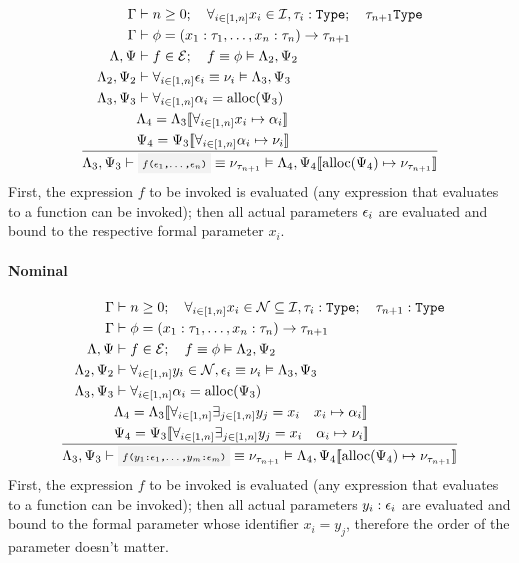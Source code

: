 \[
	\oprule[aligned]{
		\EnvSym               &\then n \geq 0 \semiq \forall_{i\in[1,n]}{x_i\in\Id,\tau_i:\Type} \semiq \tau_{n+1}\Type \\*
		\EnvSym               &\then \phi = (x_1:\tau_1,\dotsc,x_n:\tau_n)\to\tau_{n+1} \\*
		\EnvLoc,\EnvStore     &\then f\in\Expr \semiq f \eval \phi \Then \EnvLoc_2,\EnvStore_2 \\*
		\EnvLoc_2,\EnvStore_2 &\then \forall_{i\in[1,n]}{\expr_i\eval\val_i} \Then \EnvLoc_3,\EnvStore_3 \\*
		\EnvLoc_3,\EnvStore_3 &\then \forall_{i\in[1,n]}{\addr_i=\alloc(\EnvStore_3)} \\*
		                      &\EnvLoc_4 = \EnvLoc_3\env{\forall_{i\in[1,n]}{x_i\mapsto\addr_i}} \\*
		                      &\EnvStore_4 = \EnvStore_3\env{\forall_{i\in[1,n]}{\addr_i\mapsto\val_i}} \\*
	}{
		\EnvLoc_3,\EnvStore_3 \then \code{$f$($\expr_1$,$\dotsc$,$\expr_n$)} \eval \val_{\tau_{n+1}} \Then \EnvLoc_4,\EnvStore_4\env{\alloc(\EnvStore_4)\mapsto\val_{\tau_{n+1}}}
	}
\]
First, the expression $f$ to be invoked is evaluated (any expression that
evaluates to a function can be invoked); then all actual parameters $\epsilon_i$
are evaluated and bound to the respective formal parameter $x_i$.

\paragraph{Nominal}

\[
	\oprule[aligned]{
		\EnvSym               &\then n \geq 0 \semiq \forall_{i\in[1,n]}{x_i\in\mathcal{N}\subseteq\Id,\tau_i:\Type} \semiq \tau_{n+1}:\Type \\*
		\EnvSym               &\then \phi = (x_1:\tau_1,\dotsc,x_n:\tau_n)\to\tau_{n+1} \\*
		\EnvLoc,\EnvStore     &\then f\in\Expr \semiq f \eval \phi \Then \EnvLoc_2,\EnvStore_2 \\*
		\EnvLoc_2,\EnvStore_2 &\then \forall_{i\in[1,n]}{y_i\in\mathcal{N},\expr_i\eval\val_i} \Then \EnvLoc_3,\EnvStore_3 \\*
		\EnvLoc_3,\EnvStore_3 &\then \forall_{i\in[1,n]}{\addr_i=\alloc(\EnvStore_3)} \\*
		                      &\EnvLoc_4 = \EnvLoc_3\env{\forall_{i\in[1,n]}{\exists_{j\in[1,n]}{y_j=x_i \quad x_i\mapsto\addr_i}}} \\*
		                      &\EnvStore_4 = \EnvStore_3\env{\forall_{i\in[1,n]}{\exists_{j\in[1,n]}{y_j=x_i \quad \addr_i\mapsto\val_i}}} \\*
	}{
		\EnvLoc_3,\EnvStore_3 \then \code{$f$($y_1$:$\expr_1$,$\dotsc$,$y_m$:$\expr_m$)} \eval \val_{\tau_{n+1}} \Then \EnvLoc_4,\EnvStore_4\env{\alloc(\EnvStore_4)\mapsto\val_{\tau_{n+1}}}
	}
\]
First, the expression $f$ to be invoked is evaluated (any expression that
evaluates to a function can be invoked); then all actual parameters
$y_i:\epsilon_i$ are evaluated and bound to the formal parameter whose identifier
$x_i=y_j$, therefore the order of the parameter doesn't matter.

